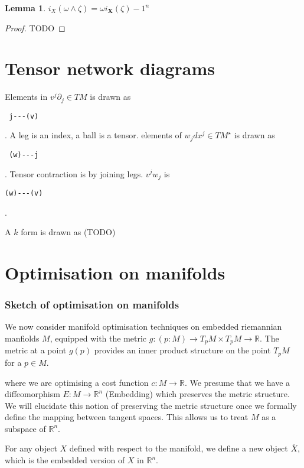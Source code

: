 \documentclass[11pt]{book}
\newcommand{\boldX}{\ensuremath{\mathbf{X}}}
\newtheorem{lemma}{Lemma}
\newtheorem{proof}{Proof}
\begin{document}
\begin{lemma}
$i_{X}(\omega \wedge \zeta ) = \omega i_\boldX (\zeta) - 1^n$
\end{lemma}
\begin{proof} TODO \end{proof}


\chapter{Tensor network diagrams}

Elements in $v^j \partial_j \in TM$  is drawn as 
\begin{verbatim} j---(v) \end{verbatim}. 
A leg is an index,
a ball is a tensor. 
elements of $w_j dx^j \in TM^\star$ is drawn as \begin{verbatim} (w)---j \end{verbatim}.
Tensor contraction is by joining legs. $v^j w_j$ is \begin{verbatim}(w)---(v)\end{verbatim}.

A $k$ form is drawn as (TODO)




\chapter{Optimisation on manifolds}

\subsection{Sketch of optimisation on manifolds}
We now consider manifold optimisation techniques on embedded riemannian manfiolds $M$,
equipped with the metric $g: (p: M) \rightarrow T_p M  \times T_p M \rightarrow \mathbb R$.
The metric at a point $g(p)$ provides an inner product structure on the point $T_pM$
for a $p \in M$.

where we are optimising a cost function $c: M \rightarrow \mathbb R$.
We presume that we have a diffeomorphism $E: M \rightarrow \mathbb R^n$ (Embedding) which
preserves the metric structure. We will elucidate this notion of preserving
the metric structure once we formally define the mapping between tangent spaces.
This allows us to treat $M$ as a subspace of $\mathbb R^n$.

For any object $X$
defined with respect to the manifold, we define a new object $\overline X$, which
is the embedded version of $X$ in $\mathbb R^n$.
\end{document}
